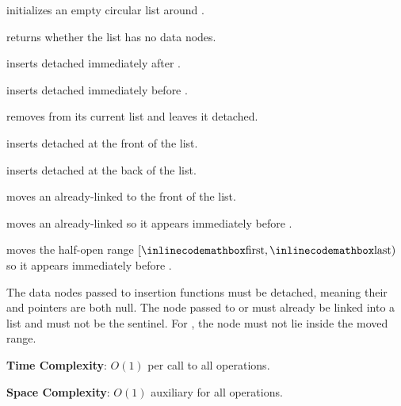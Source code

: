 \begin{compactitem}
  \item {} initializes an empty circular list around .
  \item {} returns whether the list has no data nodes.
  \item {} inserts detached  immediately after .
  \item {} inserts detached  immediately before .
  \item {} removes  from its current list and leaves it detached.
  \item {} inserts detached  at the front of the list.
  \item {} inserts detached  at the back of the list.
  \item {} moves an already-linked  to the front of the list.
  \item {} moves an already-linked  so it appears immediately before .
  \item {} moves the half-open range $[{\inlinecodemath{first}}, {\inlinecodemath{last}})$ so it appears immediately before .
\end{compactitem}

The data nodes passed to insertion functions must be detached, meaning their  and  pointers are both null. The node passed to  or  must already be linked into a list and must not be the sentinel. For , the  node must not lie inside the moved range.

\textbf{Time Complexity}: $O(1)$ per call to all operations.

\textbf{Space Complexity}: $O(1)$ auxiliary for all operations.

